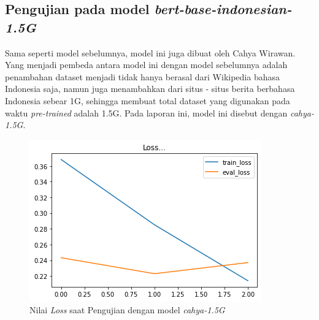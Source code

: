 \subsection{Pengujian pada model \textit{bert-base-indonesian-1.5G}}

Sama seperti model sebelumnya, model ini juga dibuat oleh Cahya Wirawan. Yang menjadi pembeda antara model ini dengan model sebelumnya adalah penambahan dataset menjadi tidak hanya berasal dari Wikipedia bahasa Indonesia saja, namun juga menambahkan dari situs - situs berita berbahasa Indonesia sebear 1G, sehingga membuat total dataset yang digunakan pada waktu \textit{pre-trained} adalah 1.5G. Pada laporan ini, model ini disebut dengan \textit{cahya-1.5G}.

\begin{figure}[h]
    \begin{center}
        \includegraphics[width= 0.9\linewidth]{gambar/loss_cahya_bert_1,5.png}
        \caption{Nilai \textit{Loss} saat Pengujian dengan model \textit{cahya-1.5G}}
        \label{fig: loss_cahya1.5}
    \end{center}
\end{figure}

